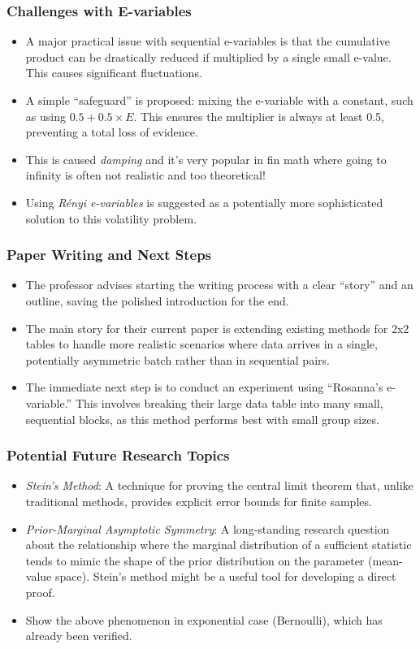 \subsubsection*{Challenges with E-variables}
\begin{itemize}
	\item A major practical issue with sequential e-variables is that the cumulative product can be drastically reduced if multiplied by a single small e-value. This causes significant fluctuations.
	\item A simple ``safeguard'' is proposed: mixing the e-variable with a constant, such as using $0.5 + 0.5 \times E$. This ensures the multiplier is always at least 0.5, preventing a total loss of evidence.
	\item This is caused \emph{damping} and it's very popular in fin math where going to infinity
	      is often not realistic and too theoretical!
	\item Using \emph{R\'enyi e-variables} is suggested as a potentially more sophisticated solution to this volatility problem.
\end{itemize}

\subsubsection*{Paper Writing and Next Steps}
\begin{itemize}
	\item The professor advises starting the writing process with a clear ``story'' and an outline, saving the polished introduction for the end.
	\item The main story for their current paper is extending existing methods for 2x2 tables to handle more realistic scenarios where data arrives in a single, potentially asymmetric batch rather than in sequential pairs.
	\item The immediate next step is to conduct an experiment using ``Rosanna's e-variable.'' This involves breaking their large data table into many small, sequential blocks, as this method performs best with small group sizes.
\end{itemize}

\subsubsection*{Potential Future Research Topics}
\begin{itemize}
	\item \emph{Stein's Method}: A technique for proving the central limit theorem that, unlike traditional methods, provides explicit error bounds for finite samples.
	\item \emph{Prior-Marginal Asymptotic Symmetry}: A long-standing research question about the relationship where the marginal distribution of a sufficient statistic tends to mimic the shape of the prior distribution on the parameter (mean-value space). Stein's method might be a useful tool for developing a direct proof.
	\item Show the above phenomenon in exponential case (Bernoulli), which has already been verified.
\end{itemize}

